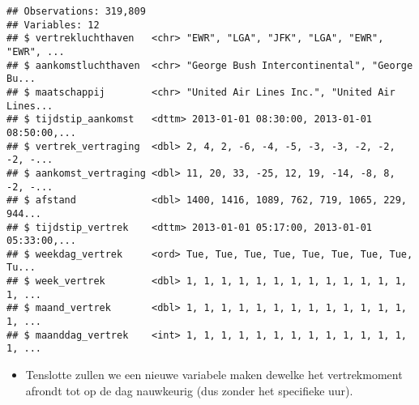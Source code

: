 \documentclass[]{memoir}
\newenvironment{Shaded}{\begin{snugshade}}{\end{snugshade}}
\newcommand{\DataTypeTok}[1]{\textcolor[rgb]{0.13,0.29,0.53}{#1}}
\newcommand{\KeywordTok}[1]{\textcolor[rgb]{0.13,0.29,0.53}{\textbf{#1}}}
\newcommand{\NormalTok}[1]{#1}
\newcommand{\OperatorTok}[1]{\textcolor[rgb]{0.81,0.36,0.00}{\textbf{#1}}}
\newcommand{\StringTok}[1]{\textcolor[rgb]{0.31,0.60,0.02}{#1}}
\providecommand{\tightlist}{%
  \setlength{\itemsep}{0pt}\setlength{\parskip}{0pt}}
\begin{document}
\begin{Shaded}
\end{Shaded}

\begin{verbatim}
## Observations: 319,809
## Variables: 12
## $ vertrekluchthaven   <chr> "EWR", "LGA", "JFK", "LGA", "EWR", "EWR", ...
## $ aankomstluchthaven  <chr> "George Bush Intercontinental", "George Bu...
## $ maatschappij        <chr> "United Air Lines Inc.", "United Air Lines...
## $ tijdstip_aankomst   <dttm> 2013-01-01 08:30:00, 2013-01-01 08:50:00,...
## $ vertrek_vertraging  <dbl> 2, 4, 2, -6, -4, -5, -3, -3, -2, -2, -2, -...
## $ aankomst_vertraging <dbl> 11, 20, 33, -25, 12, 19, -14, -8, 8, -2, -...
## $ afstand             <dbl> 1400, 1416, 1089, 762, 719, 1065, 229, 944...
## $ tijdstip_vertrek    <dttm> 2013-01-01 05:17:00, 2013-01-01 05:33:00,...
## $ weekdag_vertrek     <ord> Tue, Tue, Tue, Tue, Tue, Tue, Tue, Tue, Tu...
## $ week_vertrek        <dbl> 1, 1, 1, 1, 1, 1, 1, 1, 1, 1, 1, 1, 1, 1, ...
## $ maand_vertrek       <dbl> 1, 1, 1, 1, 1, 1, 1, 1, 1, 1, 1, 1, 1, 1, ...
## $ maanddag_vertrek    <int> 1, 1, 1, 1, 1, 1, 1, 1, 1, 1, 1, 1, 1, 1, ...
\end{verbatim}

\begin{itemize}
\tightlist
\item
  Tenslotte zullen we een nieuwe variabele maken dewelke het vertrekmoment afrondt tot op de dag nauwkeurig (dus zonder het specifieke uur).
\end{itemize}

\begin{Shaded}
\end{Shaded}
\end{document}
